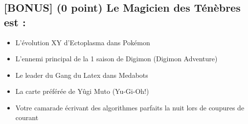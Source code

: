 \documentclass[11pt,a4paper]{article}
\begin{document}
\bigskip


\subsection{[BONUS] (0 point) Le Magicien des Ténèbres est : }

\begin{itemize}
  \item[\CaseCoche] L'évolution XY d'Ectoplasma dans Pokémon \\
  \item[\CaseCoche] L'ennemi principal de la 1 saison de Digimon (Digimon Adventure) \\
  \item[\CaseCoche] Le leader du Gang du Latex dans Medabots \\
  \item[\CaseCoche] La carte préférée de Yûgi Muto (Yu-Gi-Oh!) \\
  \item[\CaseCoche] Votre camarade écrivant des algorithmes parfaits la nuit lors de coupures de courant \\
\end{itemize}
\end{document}
